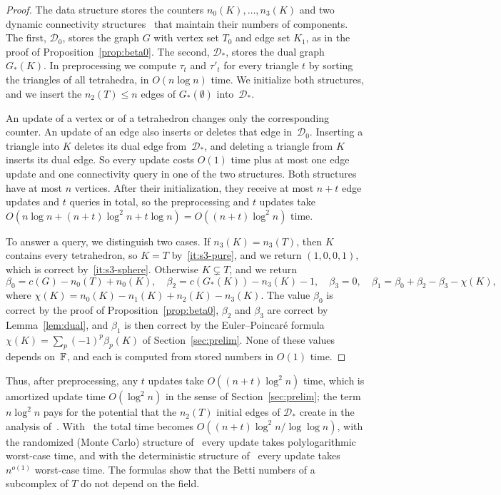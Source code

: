 \begin{proof}
The data structure stores the counters $n_0(K),\dots,n_3(K)$ and two dynamic connectivity structures~\cite{HDT01} that maintain their numbers of components.
The first, $\mathcal{D}_0$, stores the graph $G$ with vertex set $T_0$ and edge set $K_1$, as in the proof of Proposition~\ref{prop:beta0}.
The second, $\mathcal{D}_\ast$, stores the dual graph $G_\ast(K)$.
In preprocessing we compute $\tau_t$ and $\tau'_t$ for every triangle $t$ by sorting the triangles of all tetrahedra, in $O(n\log n)$ time.
We initialize both structures, and we insert the $n_2(T)\le n$ edges of $G_\ast(\emptyset)$ into~$\mathcal{D}_\ast$.

An update of a vertex or of a tetrahedron changes only the corresponding counter.
An update of an edge also inserts or deletes that edge in~$\mathcal{D}_0$.
Inserting a triangle into $K$ deletes its dual edge from~$\mathcal{D}_\ast$, and deleting a triangle from $K$ inserts its dual edge.
So every update costs $O(1)$ time plus at most one edge update and one connectivity query in one of the two structures.
Both structures have at most $n$ vertices.
After their initialization, they receive at most $n+t$ edge updates and $t$ queries in total, so the preprocessing and $t$ updates take $O(n\log n+(n+t)\log^2n+t\log n)=O((n+t)\log^2n)$ time.

To answer a query, we distinguish two cases.
If $n_3(K)=n_3(T)$, then $K$ contains every tetrahedron, so $K=T$ by~\ref{it:s3-pure}, and we return $(1,0,0,1)$, which is correct by~\ref{it:s3-sphere}.
Otherwise $K\subsetneq T$, and we return
\[
  \beta_0=c(G)-n_0(T)+n_0(K),\quad \beta_2=c(G_\ast(K))-n_3(K)-1,\quad \beta_3=0,\quad \beta_1=\beta_0+\beta_2-\beta_3-\chi(K),
\]
where $\chi(K)=n_0(K)-n_1(K)+n_2(K)-n_3(K)$.
The value $\beta_0$ is correct by the proof of Proposition~\ref{prop:beta0}, $\beta_2$ and $\beta_3$ are correct by Lemma~\ref{lem:dual}, and $\beta_1$ is then correct by the Euler--Poincar\'e formula $\chi(K)=\sum_p(-1)^p\beta_p(K)$ of Section~\ref{sec:prelim}.
None of these values depends on~$\mathbb{F}$, and each is computed from stored numbers in $O(1)$ time.
\end{proof}

Thus, after preprocessing, any $t$ updates take $O((n+t)\log^2 n)$ time, which is amortized update time $O(\log^2 n)$ in the sense of Section~\ref{sec:prelim}; the term $n\log^2n$ pays for the potential that the $n_2(T)$ initial edges of $\mathcal{D}_\ast$ create in the analysis of~\cite{HDT01}.
With~\cite{WN13} the total time becomes $O((n+t)\log^2n/\log\log n)$, with the randomized (Monte Carlo) structure of~\cite{KKM13} every update takes polylogarithmic worst-case time, and with the deterministic structure of~\cite{CGLNPS20} every update takes $n^{o(1)}$ worst-case time.
The formulas show that the Betti numbers of a subcomplex of $T$ do not depend on the field.

